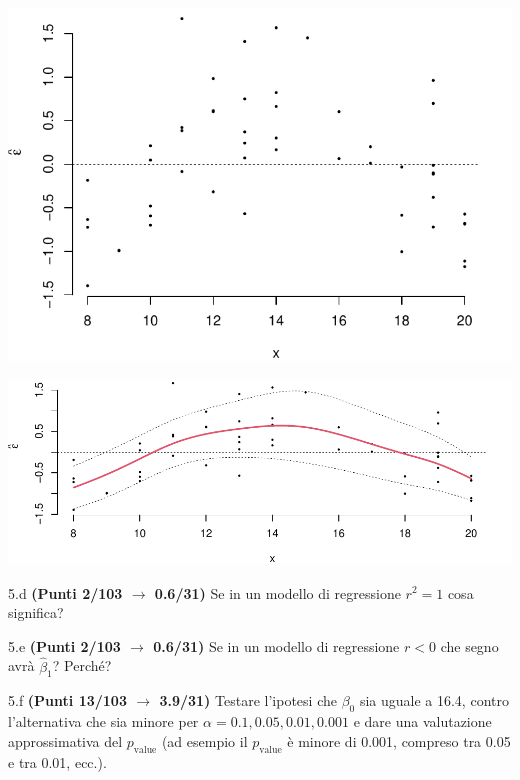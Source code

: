 \documentclass[
  11pt,
]{book}
\theoremstyle{mytheoremstyle}
\theoremstyle{mydefstyle}
\newenvironment{sol}
  {
  \begin{tcolorbox}[enhanced,breakable,arc=0.1mm,boxrule=1pt,colback=white,colframe=iblue,
  title=\bf \fontfamily{lmss}\selectfont \hspace{.5 cm} Soluzione,drop fuzzy shadow]

}{
\end{tcolorbox}
  }
\begin{document}
\begin{center}\includegraphics{Esami_passati_con_soluzioni_files/figure-latex/2024-19,-1} \end{center}

\begin{sol}

\begin{center}\includegraphics{Esami_passati_con_soluzioni_files/figure-latex/2024-20,-1} \end{center}

\end{sol}

5.d \textbf{(Punti 2/103 \(\rightarrow\) 0.6/31)} Se in un modello di regressione \(r^2=1\) cosa significa?

5.e \textbf{(Punti 2/103 \(\rightarrow\) 0.6/31)} Se in un modello di regressione \(r<0\) che segno avrà \(\hat\beta_1\)? Perché?

5.f \textbf{(Punti 13/103 \(\rightarrow\) 3.9/31)} Testare l'ipotesi che \(\beta_0\) sia uguale a 16.4, contro l'alternativa che sia minore per \(\alpha=0.1,0.05,0.01,0.001\) e dare una valutazione approssimativa del \(p_\text{value}\) (ad esempio il \(p_\text{value}\) è minore di 0.001, compreso tra 0.05 e tra 0.01, ecc.).
\end{document}
